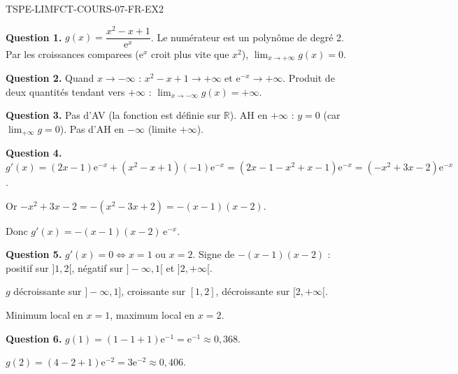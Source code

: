 \begin{corrige}{TSPE-LIMFCT-COURS-07-FR-EX2}


\textbf{Question 1.} $g(x) = \dfrac{x^2 - x + 1}{\mathrm{e}^x}$. Le numérateur est un polynôme de degré 2. Par les croissances comparees ($\mathrm{e}^x$ croit plus vite que $x^2$), $\lim_{x \to +\infty} g(x) = 0$.

\textbf{Question 2.} Quand $x \to -\infty$ : $x^2 - x + 1 \to +\infty$ et $\mathrm{e}^{-x} \to +\infty$. Produit de deux quantités tendant vers $+\infty$ : $\lim_{x \to -\infty} g(x) = +\infty$.

\textbf{Question 3.} Pas d'AV (la fonction est définie sur $\mathbb{R}$). AH en $+\infty$ : $y = 0$ (car $\lim_{+\infty} g = 0$). Pas d'AH en $-\infty$ (limite $+\infty$).

\textbf{Question 4.} $g'(x) = (2x - 1)\mathrm{e}^{-x} + (x^2 - x + 1)(-1)\mathrm{e}^{-x} = (2x - 1 - x^2 + x - 1)\mathrm{e}^{-x} = (-x^2 + 3x - 2)\mathrm{e}^{-x}$.

Or $-x^2 + 3x - 2 = -(x^2 - 3x + 2) = -(x-1)(x-2)$.

Donc $g'(x) = -(x-1)(x-2)\,\mathrm{e}^{-x}$.

\textbf{Question 5.} $g'(x) = 0 \iff x = 1$ ou $x = 2$. Signe de $-(x-1)(x-2)$ : positif sur $]1, 2[$, négatif sur $]-\infty, 1[$ et $]2, +\infty[$.

$g$ décroissante sur $]-\infty, 1]$, croissante sur $[1, 2]$, décroissante sur $[2, +\infty[$.

Minimum local en $x = 1$, maximum local en $x = 2$.

\textbf{Question 6.} $g(1) = (1 - 1 + 1)\mathrm{e}^{-1} = \mathrm{e}^{-1} \approx 0{,}368$.

$g(2) = (4 - 2 + 1)\mathrm{e}^{-2} = 3\mathrm{e}^{-2} \approx 0{,}406$.

\end{corrige}
